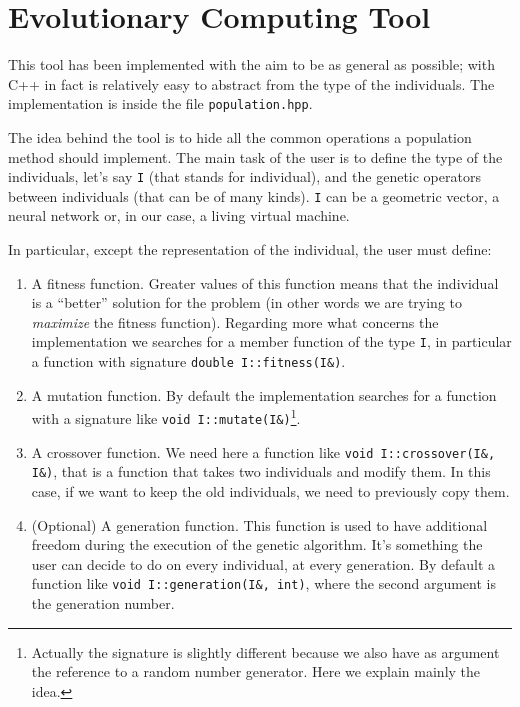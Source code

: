 \documentclass{report}
\begin{document}
\section{Evolutionary Computing Tool}
This tool has been implemented with the aim to be as general as possible; with C++ in fact is relatively easy to abstract from the type of the individuals. The implementation is inside the file \texttt{population.hpp}.

The idea behind the tool is to hide all the common operations a population method should implement. The main task of the user is to define the type of the individuals, let's say \texttt{I} (that stands for individual), and the genetic operators between individuals (that can be of many kinds). \texttt{I} can be a geometric vector, a neural network or, in our case, a living virtual machine.

In particular, except the representation of the individual, the user must define:

\begin{enumerate}
\item A fitness function. Greater values of this function means that the individual is a ``better'' solution for the problem (in other words we are trying to \textit{maximize} the fitness function). Regarding more what concerns the implementation we searches for a member function of the type \texttt{I}, in particular a function with signature \texttt{double I::fitness(I\&)}.

\item A mutation function. By default the implementation searches for a function with a signature like \texttt{void I::mutate(I\&)}\footnote{Actually the signature is slightly different because we also have as argument the reference to a random number generator. Here we explain mainly the idea.}.

\item A crossover function. We need here a function like \texttt{void I::crossover(I\&, I\&)}, that is a function that takes two individuals and modify them. In this case, if we want to keep the old individuals, we need to previously copy them.

\item (Optional) A generation function. This function is used to have additional freedom during the execution of the genetic algorithm. It's something the user can decide to do on every individual, at every generation. By default a function like \texttt{void I::generation(I\&, int)}, where the second argument is the generation number.
\end{enumerate}
\end{document}
